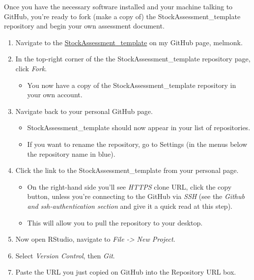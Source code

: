 \documentclass[12pt,]{article}
\providecommand{\tightlist}{%
  \setlength{\itemsep}{0pt}\setlength{\parskip}{0pt}}
\begin{document}
Once you have the necessary software installed and your machine talking
to GitHub, you're ready to fork (make a copy of) the
StockAssessment\_template repository and begin your own assessment
document.

\begin{enumerate}
\def\labelenumi{\arabic{enumi}.}
\tightlist
\item
  Navigate to the
  \href{https://github.com/melmonk/StockAssessment_template}{StockAssessment\_template}
  on my GitHub page, melmonk.
\item
  In the top-right corner of the the StockAssessment\_template
  repository page, click \emph{Fork}.

  \begin{itemize}
  \tightlist
  \item
    You now have a copy of the StockAssessment\_template repository in
    your own account.
  \end{itemize}
\item
  Navigate back to your personal GitHub page.

  \begin{itemize}
  \tightlist
  \item
    StockAssessment\_template should now appear in your list of
    repositories.
  \item
    If you want to rename the repository, go to Settings (in the menus
    below the repository name in blue).
  \end{itemize}
\item
  Click the link to the StockAssessment\_template from your personal
  page.

  \begin{itemize}
  \tightlist
  \item
    On the right-hand side you'll see \emph{HTTPS} clone URL, click the
    copy button, unless you're connecting to the GitHub via \emph{SSH}
    (see the \emph{Github and ssh-authentication section} and give it a
    quick read at this step).
  \item
    This will allow you to pull the repository to your desktop.
  \end{itemize}
\item
  Now open RStudio, navigate to \emph{File -\textgreater{} New Project}.
\item
  Select \emph{Version Control}, then \emph{Git}.
\item
  Paste the URL you just copied on GitHub into the Repository URL box.


\end{enumerate}
\end{document}
